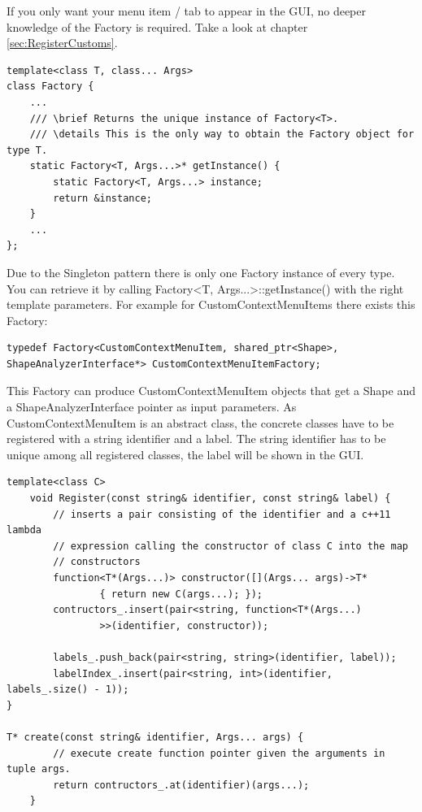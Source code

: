 \begin{mdframed}
If you only want your menu item / tab to appear in the GUI, no deeper knowledge of the Factory is required. Take a look at chapter \ref{sec:RegisterCustoms}. 
\end{mdframed}

\begin{lstlisting}[style=lstStyleCpp, caption={Factory.h}]
template<class T, class... Args>
class Factory {
    ...
    /// \brief Returns the unique instance of Factory<T>.
    /// \details This is the only way to obtain the Factory object for type T.
    static Factory<T, Args...>* getInstance() {
        static Factory<T, Args...> instance;
        return &instance;
    }
    ...
};
\end{lstlisting}

Due to the Singleton pattern there is only one Factory instance of every type. You can retrieve it by calling Factory<T, Args...>::getInstance() with the right template parameters. For example for CustomContextMenuItems there exists this Factory: 

\begin{lstlisting}[style=lstStyleCpp, numbers=none]
typedef Factory<CustomContextMenuItem, shared_ptr<Shape>, ShapeAnalyzerInterface*> CustomContextMenuItemFactory;
\end{lstlisting}

This Factory can produce CustomContextMenuItem objects that get a Shape and a ShapeAnalyzerInterface pointer as input parameters. As CustomContextMenuItem is an abstract class, the concrete classes have to be registered with a string identifier and a label. The string identifier has to be unique among all registered classes, the label will be shown in the GUI. 

\begin{lstlisting}[style=lstStyleCpp, caption=Factory.h]
template<class C>
    void Register(const string& identifier, const string& label) {
        // inserts a pair consisting of the identifier and a c++11 lambda 
        // expression calling the constructor of class C into the map 	
        // constructors
        function<T*(Args...)> constructor([](Args... args)->T* 
        		{ return new C(args...); });
        contructors_.insert(pair<string, function<T*(Args...)
        		>>(identifier, constructor));
        
        labels_.push_back(pair<string, string>(identifier, label));
        labelIndex_.insert(pair<string, int>(identifier, labels_.size() - 1));
}

T* create(const string& identifier, Args... args) {
        // execute create function pointer given the arguments in tuple args.
        return contructors_.at(identifier)(args...);
    }
\end{lstlisting}

